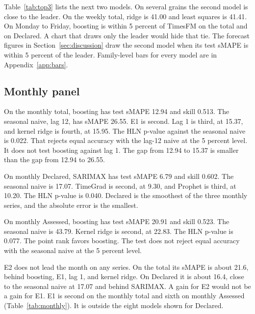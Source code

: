 Table~\ref{tab:top3} lists the next two models.
On several grains the second model is close to the leader.
On the weekly total, ridge is 41.00 and least squares is 41.41.
On Monday to Friday, boosting is within 5 percent of TimesFM on the total and on Declared.
A chart that draws only the leader would hide that tie.
The forecast figures in Section~\ref{sec:discussion} draw the second model when its test sMAPE is within 5 percent of the leader.
Family-level bars for every model are in Appendix~\ref{app:bars}.

\begin{table}[ht]
  \caption{Three lowest test sMAPE values on each series and grain.
  E1 is selective TEM.
  E2 is the disagreement proxy and is not TEM.
  E1 is second on the monthly total and third on weekly Declared.
  E2 is not in this top three.}
  \label{tab:top3}
  \centering
  \scriptsize
  
\end{table}

\subsection{Monthly panel}
\label{sec:monthly}

On the monthly total, boosting has test sMAPE 12.94 and skill 0.513.
The seasonal naive, lag 12, has sMAPE 26.55.
E1 is second.
Lag 1 is third, at 15.37, and kernel ridge is fourth, at 15.95.
The HLN p-value against the seasonal naive is 0.022.
That rejects equal accuracy with the lag-12 naive at the 5 percent level.
It does not test boosting against lag 1.
The gap from 12.94 to 15.37 is smaller than the gap from 12.94 to 26.55.

On monthly Declared, SARIMAX has test sMAPE 6.79 and skill 0.602.
The seasonal naive is 17.07.
TimeGrad is second, at 9.30, and Prophet is third, at 10.20.
The HLN p-value is 0.040.
Declared is the smoothest of the three monthly series, and the absolute error is the smallest.

On monthly Assessed, boosting has test sMAPE 20.91 and skill 0.523.
The seasonal naive is 43.79.
Kernel ridge is second, at 22.83.
The HLN p-value is 0.077.
The point rank favors boosting.
The test does not reject equal accuracy with the seasonal naive at the 5 percent level.

E2 does not lead the month on any series.
On the total its sMAPE is about 21.6, behind boosting, E1, lag 1, and kernel ridge.
On Declared it is about 16.4, close to the seasonal naive at 17.07 and behind SARIMAX.
A gain for E2 would not be a gain for E1.
E1 is second on the monthly total and sixth on monthly Assessed (Table~\ref{tab:monthly}).
It is outside the eight models shown for Declared.


